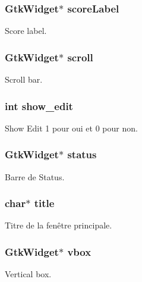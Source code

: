 \subsubsection[{\texorpdfstring{score\+Label}{scoreLabel}}]{\setlength{\rightskip}{0pt plus 5cm}Gtk\+Widget$\ast$ score\+Label}\hypertarget{struct_mydata_ae067b2d6b08b38aa73b035c82d9e14b0}{}\label{struct_mydata_ae067b2d6b08b38aa73b035c82d9e14b0}
Score label. 
\subsubsection[{\texorpdfstring{scroll}{scroll}}]{\setlength{\rightskip}{0pt plus 5cm}Gtk\+Widget$\ast$ scroll}\hypertarget{struct_mydata_abf79962e7a3ee4a5c5ef80b4058ce491}{}\label{struct_mydata_abf79962e7a3ee4a5c5ef80b4058ce491}
Scroll bar. 
\subsubsection[{\texorpdfstring{show\+\_\+edit}{show_edit}}]{\setlength{\rightskip}{0pt plus 5cm}int show\+\_\+edit}\hypertarget{struct_mydata_ac21cca965335aa0a329dc6029f743542}{}\label{struct_mydata_ac21cca965335aa0a329dc6029f743542}
Show Edit 1 pour oui et 0 pour non. 
\subsubsection[{\texorpdfstring{status}{status}}]{\setlength{\rightskip}{0pt plus 5cm}Gtk\+Widget$\ast$ status}\hypertarget{struct_mydata_ab8c991d830297ad3502ab72c109e6fe7}{}\label{struct_mydata_ab8c991d830297ad3502ab72c109e6fe7}
Barre de Status. 
\subsubsection[{\texorpdfstring{title}{title}}]{\setlength{\rightskip}{0pt plus 5cm}char$\ast$ title}\hypertarget{struct_mydata_af06d911bb9e05f491ef3da520d03796c}{}\label{struct_mydata_af06d911bb9e05f491ef3da520d03796c}
Titre de la fenêtre principale. 
\subsubsection[{\texorpdfstring{vbox}{vbox}}]{\setlength{\rightskip}{0pt plus 5cm}Gtk\+Widget$\ast$ vbox}\hypertarget{struct_mydata_a4135ce280f2ff654540c78e33ce96228}{}\label{struct_mydata_a4135ce280f2ff654540c78e33ce96228}
Vertical box. 
